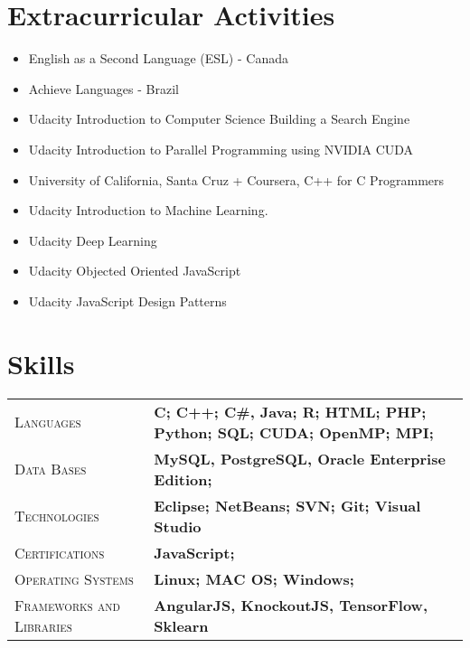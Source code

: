 \documentclass[10pt, a4paper, oneside, final]{scrartcl} %
\newcommand{\gray}{\rowcolor[gray]{.90}} %
\begin{document}


\section{Extracurricular Activities}
\begin{center}
\begin{itemize}
\item {English as a Second Language (ESL) - Canada}
\item Achieve Languages - Brazil
\item Udacity Introduction to Computer Science Building a Search Engine
\item Udacity Introduction to Parallel Programming using NVIDIA CUDA
\item University of California, Santa Cruz + Coursera, C++ for C Programmers
\item Udacity Introduction to Machine Learning.
\item Udacity Deep Learning
\item Udacity Objected Oriented JavaScript
\item Udacity JavaScript Design Patterns
\end{itemize}
\end{center}


\section{Skills}

\begin{center}
\begin{tabularx}{1.0\linewidth}{>{\raggedleft\scshape}p{3.2cm}X}
\gray Languages & \textbf{C; C++; C\#, Java; R; HTML; PHP; Python; SQL; CUDA; OpenMP; MPI;}\\
\gray Data Bases & \textbf{MySQL, PostgreSQL, Oracle Enterprise Edition;}\\
\gray Technologies & \textbf{Eclipse; NetBeans; SVN; Git; Visual Studio}\\
\gray Certifications & \textbf{JavaScript;}\\
\gray Operating Systems & \textbf{Linux; MAC OS; Windows;}\\
\gray Frameworks and Libraries & \textbf{AngularJS, KnockoutJS, TensorFlow, Sklearn}\\
\end{tabularx}
\end{center}
\end{document}
